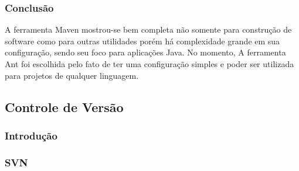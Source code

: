 \documentclass[12pt,a4paper]{article}
\begin{document}
		
		\subsubsection{Conclusão}
			A ferramenta Maven mostrou-se bem completa não somente para construção de software como para outras utilidades porém
			há complexidade grande em sua configuração, sendo seu foco para aplicações Java. No momento, A ferramenta Ant foi
			escolhida pelo fato de ter uma configuração simples e poder ser utilizada para projetos de qualquer linguagem.
	
	\clearpage		
	\subsection{Controle de Versão}
		\subsubsection{Introdução}
		\subsubsection{SVN}
\end{document}
